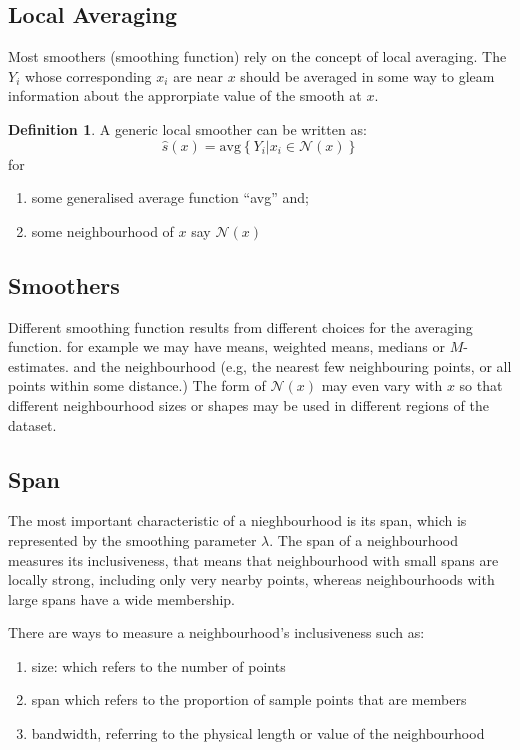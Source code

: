 \documentclass[twoside]{article}
\theoremstyle{definition}
\theoremstyle{definition}
\newtheorem*{proof1}{Definition}
\newenvironment{ddef}{\begin{dBox}\begin{proof1}}{\hfill{\scriptsize}\end{proof1}\end{dBox}}
\begin{document}
\subsection{Local Averaging}
Most smoothers (smoothing function) rely on the concept of local averaging. The $Y_i$ whose corresponding $x_i$ are near $x$ should be averaged in some way to gleam information about the approrpiate value of the smooth at $x$. 
\begin{ddef}
A generic local smoother can be written as:
\begin{equation}
	\hat{s}(x) = \text{avg} \left\{ Y_i| x_i \in \mathcal{N}(x) \right\}
\end{equation}
for \begin{enumerate}
	\item some generalised average function ``avg'' and;
	\item some neighbourhood of $x$ say $\mathcal{N}(x)$
\end{enumerate}
\end{ddef}

\subsection{Smoothers}
Different smoothing function results from different choices for the averaging function. for example we may have means, weighted means, medians or $M$-estimates. and the neighbourhood (e.g, the nearest few neighbouring points, or all points within some distance.) 
The form of $\mathcal{N}(x)$ may even vary with $x$ so that different neighbourhood sizes or shapes may be used in different regions of the dataset.
\subsection{Span}
The most important characteristic of a nieghbourhood is its span, which is represented by the smoothing parameter $\lambda$. The span of a neighbourhood measures its inclusiveness, that means that neighbourhood with small spans are locally strong, including only very nearby points, whereas neighbourhoods with large spans have a wide membership.  

There are ways to measure a neighbourhood's inclusiveness such as:
\begin{enumerate}
	\item size: which refers to the number of points 
	\item span which refers to the proportion of sample points that are members
	\item bandwidth, referring to the physical length or value of the neighbourhood
\end{enumerate}
\end{document}
